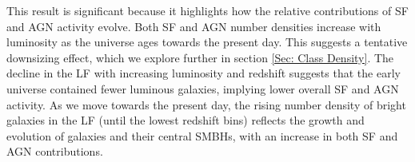 This result is significant because it highlights how the relative contributions of SF and AGN activity evolve. Both SF and AGN number densities increase with luminosity as the universe ages towards the present day. This suggests a tentative downsizing effect, which we explore further in section \ref{Sec: Class Density}. The decline in the LF with increasing luminosity and redshift suggests that the early universe contained fewer luminous galaxies, implying lower overall SF and AGN activity. As we move towards the present day, the rising number density of bright galaxies in the LF (until the lowest redshift bins) reflects the growth and evolution of galaxies and their central SMBHs, with an increase in both SF and AGN contributions.